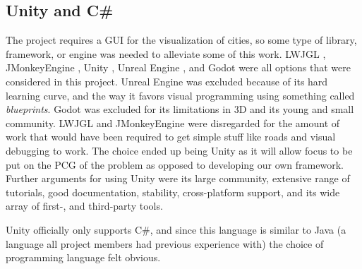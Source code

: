 \subsection{Unity and C\#}
The project requires a GUI for the visualization of cities, so some type of library, framework, or engine was needed to alleviate some of this work.
LWJGL \cite{lwjgl}, JMonkeyEngine \cite{jmonkey}, Unity \cite{unity}, Unreal Engine \cite{unreal}, and Godot \cite{godot} were all options that were considered in this project.
Unreal Engine was excluded because of its hard learning curve, and the way it favors visual programming using something called \textit{blueprints}.
Godot was excluded for its limitations in 3D and its young and small community.
LWJGL and JMonkeyEngine were disregarded for the amount of work that would have been required to get simple stuff like roads and visual debugging to work.
The choice ended up being Unity as it will allow focus to be put on the PCG of the problem as opposed to developing our own framework.
Further arguments for using Unity were its large community, extensive range of tutorials, good documentation, stability, cross-platform support, and its wide array of first-, and third-party tools.

Unity officially only supports C\#, and since this language is similar to Java (a language all project members had previous experience with) the choice of programming language felt obvious.